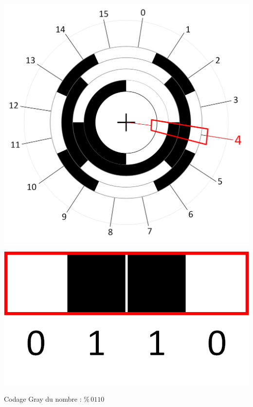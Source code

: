 \documentclass[11pt,a4paper]{article}
\begin{document}
\begin{table}[!ht]
\begin{minipage}{0.45\textwidth}
  \end{minipage}
  \hfillx
  \begin{minipage}{0.45\textwidth}
    \centering

  \includegraphics[scale=0.35]{img/BCD_Gray/Roue_Codeuse_Gray_4bits_Example_4.png}

  \includegraphics[scale=0.24]{img/BCD_Gray/Code_Gray_4.png}

   Codage Gray du nombre  \fg{} : $ \text{\%} \, 0110 $


%
%

  \end{minipage}
\end{table}
\end{document}
